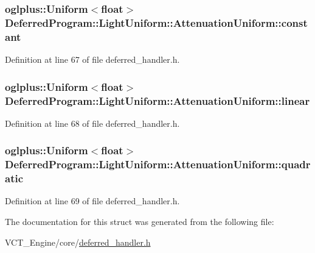 \subsubsection[{constant}]{\setlength{\rightskip}{0pt plus 5cm}oglplus\+::\+Uniform$<$float$>$ Deferred\+Program\+::\+Light\+Uniform\+::\+Attenuation\+Uniform\+::constant}\label{struct_deferred_program_1_1_light_uniform_1_1_attenuation_uniform_a1ba6809e503adc15b73b992f88c0dd24}


Definition at line 67 of file deferred\+\_\+handler.\+h.

\hypertarget{struct_deferred_program_1_1_light_uniform_1_1_attenuation_uniform_ac93e1950d2f61345cb2c4ae1dea0f991}{}
\subsubsection[{linear}]{\setlength{\rightskip}{0pt plus 5cm}oglplus\+::\+Uniform$<$float$>$ Deferred\+Program\+::\+Light\+Uniform\+::\+Attenuation\+Uniform\+::linear}\label{struct_deferred_program_1_1_light_uniform_1_1_attenuation_uniform_ac93e1950d2f61345cb2c4ae1dea0f991}


Definition at line 68 of file deferred\+\_\+handler.\+h.

\hypertarget{struct_deferred_program_1_1_light_uniform_1_1_attenuation_uniform_a7ab81a4f6fc4e6c8c9a4f842f666fa2d}{}
\subsubsection[{quadratic}]{\setlength{\rightskip}{0pt plus 5cm}oglplus\+::\+Uniform$<$float$>$ Deferred\+Program\+::\+Light\+Uniform\+::\+Attenuation\+Uniform\+::quadratic}\label{struct_deferred_program_1_1_light_uniform_1_1_attenuation_uniform_a7ab81a4f6fc4e6c8c9a4f842f666fa2d}


Definition at line 69 of file deferred\+\_\+handler.\+h.



The documentation for this struct was generated from the following file\+:\begin{DoxyCompactItemize}
\item 
V\+C\+T\+\_\+\+Engine/core/\hyperlink{deferred__handler_8h}{deferred\+\_\+handler.\+h}\end{DoxyCompactItemize}

